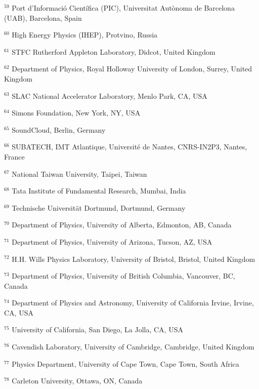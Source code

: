 \par {\footnotesize $^{59}$ Port d’Informació Científica (PIC), Universitat Autònoma de Barcelona (UAB), Barcelona, Spain}
\par {\footnotesize $^{60}$ High Energy Physics (IHEP), Protvino, Russia}
\par {\footnotesize $^{61}$ STFC Rutherford Appleton Laboratory, Didcot, United Kingdom}
\par {\footnotesize $^{62}$ Department of Physics, Royal Holloway University of London, Surrey, United Kingdom}
\par {\footnotesize $^{63}$ SLAC National Accelerator Laboratory, Menlo Park, CA, USA}
\par {\footnotesize $^{64}$ Simons Foundation, New York, NY, USA}
\par {\footnotesize $^{65}$ SoundCloud, Berlin, Germany}
\par {\footnotesize $^{66}$ SUBATECH, IMT Atlantique, Université de Nantes, CNRS-IN2P3, Nantes, France}
\par {\footnotesize $^{67}$ National Taiwan University, Taipei, Taiwan}
\par {\footnotesize $^{68}$ Tata Institute of Fundamental Research, Mumbai, India}
\par {\footnotesize $^{69}$ Technische Universit\"at Dortmund, Dortmund, Germany}
\par {\footnotesize $^{70}$ Department of Physics, University of Alberta, Edmonton, AB, Canada}
\par {\footnotesize $^{71}$ Department of Physics, University of Arizona, Tucson, AZ, USA}
\par {\footnotesize $^{72}$ H.H. Wills Physics Laboratory, University of Bristol, Bristol, United Kingdom}
\par {\footnotesize $^{73}$ Department of Physics, University of British Columbia, Vancouver, BC, Canada}
\par {\footnotesize $^{74}$ Department of Physics and Astronomy, University of California Irvine, Irvine, CA, USA}
\par {\footnotesize $^{75}$ University of California, San Diego, La Jolla, CA, USA}
\par {\footnotesize $^{76}$ Cavendish Laboratory, University of Cambridge, Cambridge, United Kingdom}
\par {\footnotesize $^{77}$ Physics Department, University of Cape Town, Cape Town, South Africa}
\par {\footnotesize $^{78}$ Carleton University, Ottawa, ON, Canada}
